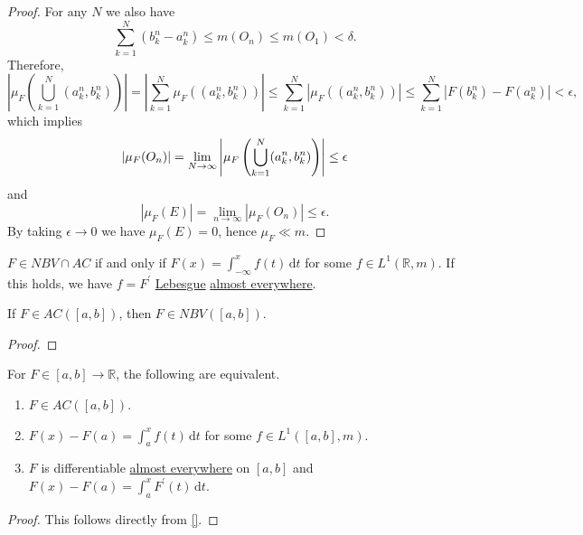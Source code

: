 \begin{proof}
	For any \(N\) we also have
	\[
		\sum_{k=1}^N (b_k^n - a_k^n) \leq m(O_n) \leq m(O_1) < \delta.
	\]
	Therefore,
	\[
		\left\vert \mu_F\left( \bigcup_{k=1}^N (a_k^n,b_k^n) \right) \right\vert
		= \left\vert \sum_{k=1}^N \mu_F((a_k^n,b_k^n)) \right\vert
		\leq \sum_{k=1}^N \left\vert \mu_F((a_k^n,b_k^n)) \right\vert
		\leq \sum_{k=1}^N \left\vert F(b_k^n) - F(a_k^n) \right\vert < \epsilon,
	\]
	which implies
	\[
		\left\vert \mu_F(O_n) \right\vert = \lim_{N \to \infty} \left\vert \mu_F\left( \bigcup_{k=1}^N (a_k^n,b_k^n) \right) \right\vert \leq \epsilon \\
	\]
	and
	\[
		\left\vert \mu_F(E) \right\vert = \lim_{n \to \infty} \left\vert \mu_F(O_n) \right\vert \leq \epsilon.
	\]
	By taking \(\epsilon \to 0\) we have \(\mu_F(E) = 0\), hence \(\mu_F \ll m\).
\end{proof}

\begin{corollary}
	\(F \in NBV \cap AC\) if and only if \(F(x) = \int_{-\infty}^x f(t) \,\mathrm{d}t\) for some \(f \in L^1(\mathbb{R},m)\). If this holds, we have \(f = F^\prime \)
	\hyperref[def:Lebesgue-measure]{Lebesgue} \hyperref[def:mu-almost-everywhere]{almost everywhere}.
\end{corollary}

\begin{lemma}
	If \(F \in AC([a,b])\), then \(F \in NBV([a,b])\).
\end{lemma}

\begin{proof}
\end{proof}

\begin{theorem}\label{thm:FTC}
	For \(F \in [a,b] \to \mathbb{R}\), the following are equivalent.
	\begin{enumerate}[(1)]
		\item \(F \in AC([a,b])\).
		\item \(F(x) - F(a) = \int_a^x f(t) \,\mathrm{d}t\) for some \(f \in L^1([a,b],m)\).
		\item \(F\) is differentiable \hyperref[def:mu-almost-everywhere]{almost everywhere} on \([a,b]\) and \(F(x) - F(a) = \int_a^x F^\prime (t) \,\mathrm{d}t\).
	\end{enumerate}
\end{theorem}
\begin{proof}
	This follows directly from \autoref{}.
\end{proof}


